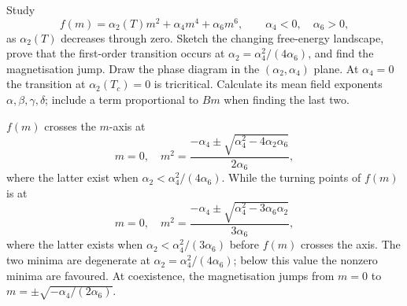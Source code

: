 Study
\begin{equation}
    f(m)=\alpha_2(T)m^2+\alpha_4m^4+\alpha_6m^6,
    \qquad \alpha_4<0,\quad\alpha_6>0,
\end{equation}
as $\alpha_2(T)$ decreases through zero. Sketch the changing free-energy
landscape, prove that the first-order transition occurs at
$\alpha_2=\alpha_4^2/(4\alpha_6)$, and find the magnetisation jump.
Draw the phase diagram in the $(\alpha_2,\alpha_4)$ plane.
At $\alpha_4=0$ the transition at $\alpha_2(T_c)=0$ is tricritical.
Calculate its mean field exponents $\alpha,\beta,\gamma,\delta$; include a
term proportional to $Bm$ when finding the last two.
\begin{solution}
    $f(m)$ crosses the $m$-axis at
    \begin{equation}
        m = 0, \quad m^2 = \frac{-\alpha_4 \pm \sqrt{ \alpha_4^2 - 4\alpha_2 \alpha_6}}{2\alpha_6},
    \end{equation}
    where the latter exist when $\alpha_2 < \alpha^2_4 /(4\alpha_6)$. While the turning points of $f(m)$ is at
    \begin{equation}
        m= 0, \quad m^2 = \frac{-\alpha_4 \pm \sqrt{\alpha_4^2   - 3\alpha_6 \alpha_2}}{3\alpha_6},
    \end{equation}
    where the latter exists when $\alpha_2 < \alpha^2_4 /(3\alpha_6)$ before $f(m)$ crosses the axis. The two minima are degenerate at $\alpha_2=\alpha_4^2/(4\alpha_6)$; below this value the nonzero minima are favoured. At coexistence, the magnetisation jumps from $m=0$ to $m=\pm\sqrt{-\alpha_4/(2\alpha_6)}$.


\end{solution}
